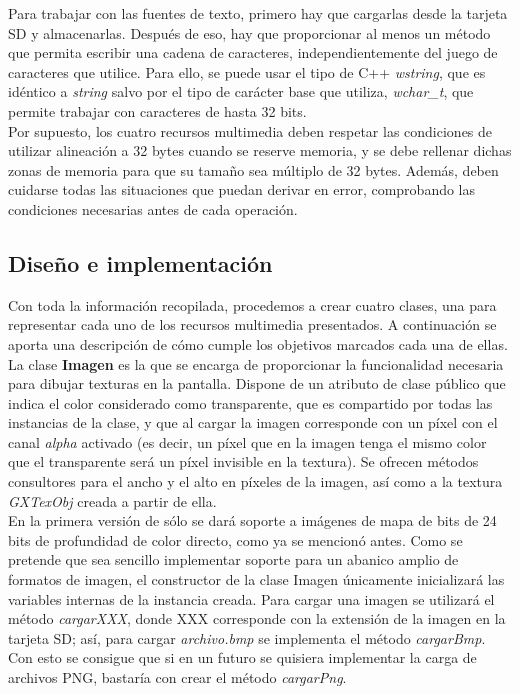 Para trabajar con las fuentes de texto, primero hay que cargarlas desde la tarjeta SD y almacenarlas. Después de eso, hay que proporcionar al menos un método que permita escribir una cadena de caracteres, independientemente del juego de caracteres que utilice. Para ello, se puede usar el tipo de C++ \emph{wstring}, que es idéntico a \emph{string} salvo por el tipo de carácter base que utiliza, \emph{wchar\_t}, que permite trabajar con caracteres de hasta 32 bits.\\

Por supuesto, los cuatro recursos multimedia deben respetar las condiciones de utilizar alineación a 32 bytes cuando se reserve memoria, y se debe rellenar dichas zonas de memoria para que su tamaño sea múltiplo de 32 bytes. Además, deben cuidarse todas las situaciones que puedan derivar en error, comprobando las condiciones necesarias antes de cada operación.

\subsection{Diseño e implementación}

Con toda la información recopilada, procedemos a crear cuatro clases, una para representar cada uno de los recursos multimedia presentados. A continuación se aporta una descripción de cómo cumple los objetivos marcados cada una de ellas.\\

La clase \textbf{Imagen} es la que se encarga de proporcionar la funcionalidad necesaria para dibujar texturas en la pantalla. Dispone de un atributo de clase público que indica el color considerado como transparente, que es compartido por todas las instancias de la clase, y que al cargar la imagen corresponde con un píxel con el canal \emph{alpha} activado (es decir, un píxel que en la imagen tenga el mismo color que el transparente será un píxel invisible en la textura). Se ofrecen métodos consultores para el ancho y el alto en píxeles de la imagen, así como a la textura \emph{GXTexObj} creada a partir de ella.\\

En la primera versión de  sólo se dará soporte a imágenes de mapa de bits de 24 bits de profundidad de color directo, como ya se mencionó antes. Como se pretende que sea sencillo implementar soporte para un abanico amplio de formatos de imagen, el constructor de la clase Imagen únicamente inicializará las variables internas de la instancia creada. Para cargar una imagen se utilizará el método \emph{cargarXXX}, donde XXX corresponde con la extensión de la imagen en la tarjeta SD; así, para cargar \emph{archivo.bmp} se implementa el método \emph{cargarBmp}. Con esto se consigue que si en un futuro se quisiera implementar la carga de archivos PNG, bastaría con crear el método \emph{cargarPng}.\\

